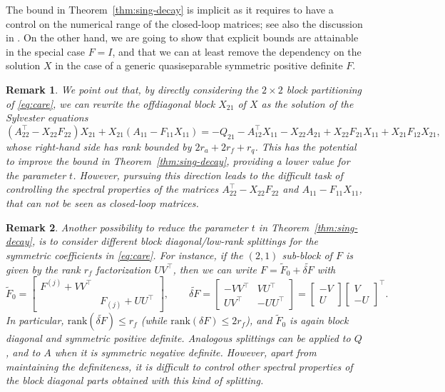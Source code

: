 \documentclass[a4paper,10pt]{article}
\def\rank{\mathrm{rank}}
\newtheorem{remark}{Remark}
\begin{document}
The bound in Theorem~\ref{thm:sing-decay} is implicit as it requires to have a control on the numerical range of the closed-loop matrices; see also the discussion in \cite[Section 2.1]{kressner20}.  
On the other hand, we are going to show that explicit bounds are attainable in the special case $F=I$, and that we can at least remove the dependency on the solution $X$ in the case of a generic quasiseparable symmetric positive definite $F$.
\begin{remark}\label{rem:improv1}
We point out that, by directly considering the $2\times 2$ block partitioning of \eqref{eq:care}, we can rewrite the offdiagonal block $X_{21}$ of $X$ as the solution of the Sylvester equations
$$
(A_{22}^\top-X_{22}F_{22})X_{21}+ X_{21}(A_{11}-F_{11}X_{11})=-Q_{21}-A_{12}^\top X_{11}-X_{22}A_{21}+X_{22}F_{21}X_{11}+X_{21}F_{12}X_{21},
$$
whose right-hand side has rank bounded by $2r_a+2r_f+r_q$. This has the potential to improve the bound in Theorem~\ref{thm:sing-decay}, providing a lower value for the parameter $t$. However, pursuing this direction leads to the difficult task of controlling the spectral properties of the matrices $A_{22}^\top-X_{22}F_{22}$ and $A_{11}-F_{11}X_{11}$, that can not be seen as closed-loop matrices.
\end{remark}
\begin{remark}\label{rem:improv2}
Another possibility to reduce the parameter $t$ in Theorem~\ref{thm:sing-decay}, is to consider different block diagonal/low-rank splittings for the symmetric coefficients in \eqref{eq:care}. For instance, if the $(2,1)$ sub-block of $F$ is given by the rank $r_f$ factorization $UV^\top$, then we can write $F=\widetilde{F}_0+\widetilde{\delta F}$ with
$$
\widetilde{F}_0=\begin{bmatrix}
F^{(j)}+VV^\top\\ &F_{(j)}+ UU^\top
\end{bmatrix},\qquad
\widetilde{\delta F}=\begin{bmatrix}
-VV^\top&VU^\top\\
UV^\top& -UU^\top
\end{bmatrix}=\begin{bmatrix}
-V\\ U
\end{bmatrix}\begin{bmatrix}
V\\-U
\end{bmatrix}^\top.
$$
In particular, $\rank(\widetilde{\delta F})\le r_f$ (while $\rank(\delta F)\le 2r_f$), and $\widetilde F_0$ is again block diagonal and symmetric positive definite. Analogous splittings can be applied to $Q$, and to $A$ when it is symmetric negative definite. However, apart from maintaining the definiteness, it is difficult to control other spectral properties of the block diagonal parts obtained with this kind of splitting.  
\end{remark}	
\end{document}
